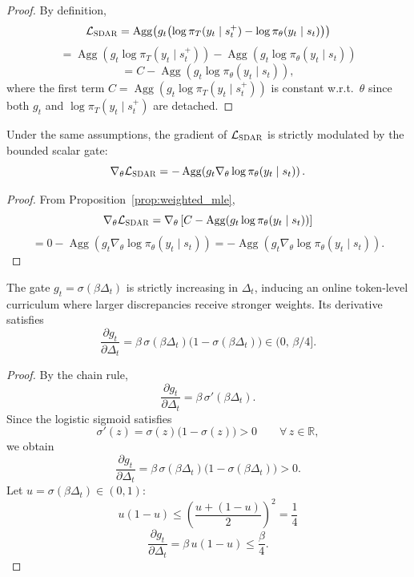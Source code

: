 \begin{proof}
By definition,
\[
\mathcal{L}_{\textsc{SDAR}}
= \operatorname{Agg}\!\left(
g_t \bigl(\log \pi_T(y_t \mid s_t^{+}) - \log \pi_{\theta}(y_t \mid s_t)\bigr)
\right)
\]
\[
= \operatorname{Agg}\!\left(
g_t \log \pi_T(y_t \mid s_t^{+})
\right)
-
\operatorname{Agg}\!\left(
g_t \log \pi_{\theta}(y_t \mid s_t)
\right)
\]
\[
= C - \operatorname{Agg}\!\left( g_t \log \pi_{\theta}(y_t \mid s_t) \right),
\]
where the first term $C = \operatorname{Agg}\!\left( g_t \log \pi_T(y_t \mid s_t^{+}) \right)$ is constant w.r.t.\ $\theta$ since both $g_t$ and $\log \pi_T(y_t \mid s_t^{+})$ are detached.
\end{proof}

\begin{proposition}
\label{prop:grad_form}
Under the same assumptions,
the gradient of $\mathcal{L}_{\textsc{SDAR}}$ is strictly modulated by the bounded scalar gate:
\[
\nabla_{\theta}\mathcal{L}_{\textsc{SDAR}}
= - \operatorname{Agg}\!\left( g_t \nabla_{\theta}\log \pi_{\theta}(y_t \mid s_t) \right).
\]
\end{proposition}

\begin{proof}
From Proposition~\ref{prop:weighted_mle},
\[
\nabla_{\theta}\mathcal{L}_{\textsc{SDAR}}
= \nabla_{\theta}\left[
C - \operatorname{Agg}\!\left( g_t \log \pi_{\theta}(y_t \mid s_t) \right)
\right]
\]
\[
= 0 - \operatorname{Agg}\!\left( g_t \nabla_{\theta}\log \pi_{\theta}(y_t \mid s_t) \right)
= - \operatorname{Agg}\!\left( g_t \nabla_{\theta}\log \pi_{\theta}(y_t \mid s_t) \right).
\]
\end{proof}

\begin{proposition}
\label{prop:gate}
The gate $g_t = \sigma(\beta \Delta_t)$ is strictly increasing in $\Delta_t$,
inducing an online token-level curriculum where larger discrepancies receive stronger weights.
Its derivative satisfies
\[
\frac{\partial g_t}{\partial \Delta_t}
= \beta \,\sigma(\beta \Delta_t)\bigl(1-\sigma(\beta \Delta_t)\bigr)
\in (0,\,\beta/4].
\]
\end{proposition}

\begin{proof}
By the chain rule,
\[
\frac{\partial g_t}{\partial \Delta_t}
= \beta \,\sigma'(\beta \Delta_t).
\]
Since the logistic sigmoid satisfies
\[
\sigma'(z) = \sigma(z)\bigl(1-\sigma(z)\bigr) > 0
\qquad \forall\, z \in \mathbb{R},
\]
we obtain
\[
\frac{\partial g_t}{\partial \Delta_t}
= \beta \,\sigma(\beta \Delta_t)\bigl(1-\sigma(\beta \Delta_t)\bigr)
> 0.
\]
Let $u = \sigma(\beta \Delta_t) \in (0,1)$:
\[
u(1-u) \le \left(\frac{u + (1-u)}{2}\right)^{\!2} = \frac{1}{4}
\]
\[
\frac{\partial g_t}{\partial \Delta_t}
= \beta\, u(1-u) \le \frac{\beta}{4}.
\]
\end{proof}


